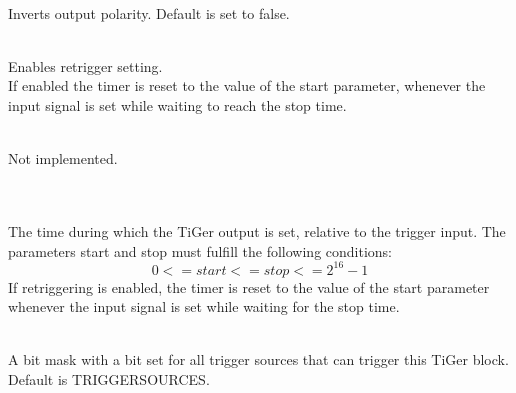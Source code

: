 	\\
	Inverts output polarity. Default is set to false.
	\par

	\\
	Enables retrigger setting.\\
	If enabled the timer is reset to the value of the \textsf{start} parameter, whenever the input signal is set while waiting to reach the \textsf{stop} time.\par

	\\
	Not implemented.


	\\
	\\
	The time during which the TiGer output is set, relative to the trigger input. The parameters \textsf{start} and \textsf{stop} must fulfill the following conditions:
	\[ 0 <= start <= stop <= 2^{16}-1 \]
	If retriggering is enabled, the timer is reset to the value of the start parameter whenever the input signal is set while waiting for the stop time. \par
	

	\\
	A bit mask with a bit set for all trigger sources that can trigger this TiGer block. 
	Default is \textsf{\PREFIX TRIGGER\tu SOURCE\tu S}.\par

